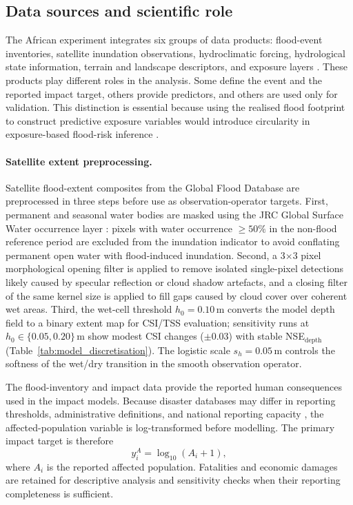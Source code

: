 \documentclass[pdflatex,sn-mathphys-ay]{sn-jnl}
\theoremstyle{thmstyleone}
\begin{document}
\begin{appendices}
\subsection{Data sources and scientific role}
\label{app:data_sources}

The African experiment integrates six groups of data products:
flood-event inventories, satellite inundation observations,
hydroclimatic forcing, hydrological state information, terrain and
landscape descriptors, and exposure layers
\citep{EMDAT2024,Tellman2021,Stephens2015}.  These products play
different roles in the analysis.  Some define the event and the
reported impact target, others provide predictors, and others are used
only for validation.  This distinction is essential because using the
realised flood footprint to construct predictive exposure variables
would introduce circularity in exposure-based flood-risk inference
\citep{Tellman2021,Rentschler2022}.

\paragraph{Satellite extent preprocessing.}
Satellite flood-extent composites from the Global Flood Database
\citep{Tellman2021} are preprocessed in three steps before use as
observation-operator targets.
First, permanent and seasonal water bodies are masked using the
JRC Global Surface Water occurrence layer
\citep{Pekel2016}: pixels with water occurrence
$\geq 50\%$ in the non-flood reference period are excluded from the
inundation indicator to avoid conflating permanent open water with
flood-induced inundation.
Second, a 3$\times$3 pixel morphological opening filter is applied to
remove isolated single-pixel detections likely caused by specular
reflection or cloud shadow artefacts, and a closing filter of the same
kernel size is applied to fill gaps caused by cloud cover over
coherent wet areas.
Third, the wet-cell threshold $h_0 = 0.10\,\mathrm{m}$ converts
the model depth field to a binary extent map for CSI/TSS evaluation;
sensitivity runs at $h_0\in\{0.05,0.20\}\,\mathrm{m}$ show modest
CSI changes ($\pm 0.03$) with stable NSE$_{\mathrm{depth}}$
(Table~\ref{tab:model_discretisation}).
The logistic scale $s_h = 0.05\,\mathrm{m}$ controls the softness of
the wet/dry transition in the smooth observation operator.

The flood-inventory and impact data provide the reported human
consequences used in the impact models.  Because disaster databases
may differ in reporting thresholds, administrative definitions, and
national reporting capacity \citep{Below2009,Kron2012,EMDAT2024}, the affected-population variable is
log-transformed before modelling.  The primary impact target is
therefore
\begin{equation}
  y^{A}_{i}
  =
  \log_{10}
  \left(
    A_i+1
  \right),
  \label{eq:app_log_impact}
\end{equation}
where $A_i$ is the reported affected population.  Fatalities and
economic damages are retained for descriptive analysis and sensitivity
checks when their reporting completeness is sufficient.


\end{appendices}
\end{document}
